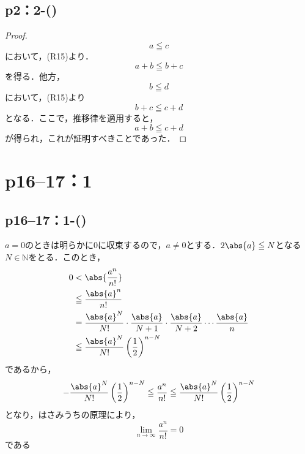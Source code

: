 \subsection*{p2：2-()}

\begin{leftbar}
    \begin{proof}
        \[
            a \leqq c
        \]
        において，(R15)より．
        \[
            a+b \leqq b+c
        \]
        を得る．他方，
        \[
            b \leqq d
        \]
        において，(R15)より
        \[
            b + c \leqq c+d
        \]
        となる．ここで，推移律を適用すると，
        \[
            a+b \leqq c+d
        \]
        が得られ，これが証明すべきことであった．
    \end{proof}
\end{leftbar}
%
\section*{p16--17：1}

\subsection*{p16--17：1-()}

\begin{tleftbar}
    $a=0$のときは明らかに$0$に収束するので，$a \ne 0$とする．$2\abs{a} \le N$となる$N \in \mathbb{N}$をとる．このとき，
    \begin{align*}
        0 & < \abs{ \frac{a^n}{n!} }                                                                              \\
          & \le \frac{\abs{a}^n}{n!}                                                                              \\
          & = \frac{\abs{a}^{N}}{N!} \cdot \frac{\abs{a}}{N+1} \cdot \frac{\abs{a}}{N+2} \dotsm \frac{\abs{a}}{n} \\
          & \le  \frac{\abs{a}^{N}}{N!} \left(\frac{1}{2} \right)^{n-N}
    \end{align*}
    であるから，
    \[
        - \frac{\abs{a}^{N}}{N!} \left(\frac{1}{2} \right)^{n-N} \le  \frac{a^n}{n!} \le \frac{\abs{a}^{N}}{N!} \left(\frac{1}{2} \right)^{n-N}
    \]
    となり，はさみうちの原理により，
    \[
        \lim_{n \to \infty} \frac{a^n}{n!} =0
    \]
    である
\end{tleftbar}

